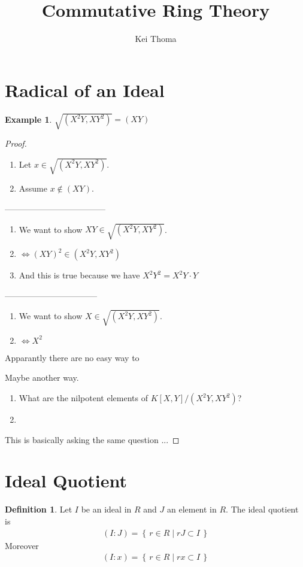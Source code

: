 \documentclass[a4paper]{book}
\title{Commutative Ring Theory}
\author{Kei Thoma}
\theoremstyle{definition}
\newtheorem{definition}{Definition}[]
\newtheorem{example}{Example}[definition]
\newcommand{\makeset}[2]{\left\{\, #1 \mid #2 \,\right\}}
\begin{document}
\section{Radical of an Ideal}
\begin{example}
  \(\sqrt{(X^2Y, XY^2)} = (XY)\)
\end{example}
\begin{proof}
  \begin{enumerate}
    \item Let \(x \in \sqrt{(X^2Y, XY^2)}\).
    \item Assume \(x \not\in (XY)\).
  \end{enumerate}

  ------------------------------------

  \begin{enumerate}
    \item We want to show \(XY \in \sqrt{(X^2Y, XY^2)}\).
    \item \(\iff (XY)^2 \in (X^2Y, XY^2)\)
    \item And this is true because we have \(X^2Y^2 = X^2Y \cdot Y\)
  \end{enumerate}

  ---------------------------------

  \begin{enumerate}
    \item We want to show \(X \in \sqrt{(X^2Y, XY^2)}\).
    \item \(\iff X^2 \)
  \end{enumerate}

  Apparantly there are no easy way to

  Maybe another way.
  \begin{enumerate}
    \item What are the nilpotent elements of \(K[X, Y] / (X^2Y, XY^2)\)?
    \item 
  \end{enumerate}

  This is basically asking the same question ...
\end{proof}

\section{Ideal Quotient}
\begin{defbox}
  \begin{definition}
    Let \(I\) be an ideal in \(R\) and \(J\) an element in \(R\). The ideal quotient is
    \begin{align*}
      (I : J) = \makeset{r \in R}{rJ \subset I}
    \end{align*}
    Moreover
    \begin{align*}
      (I : x) = \makeset{r \in R}{rx \subset I}
    \end{align*}
  \end{definition}
\end{defbox}
\end{document}
